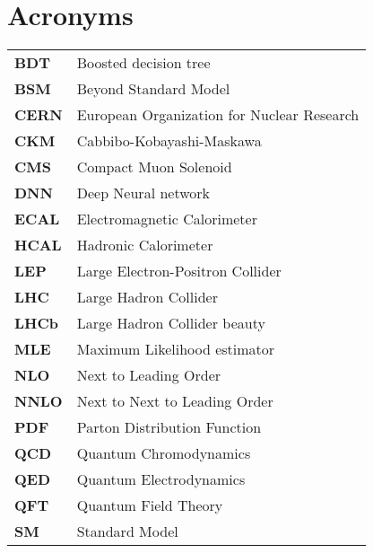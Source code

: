 
\newpage
\chapter*{Acronyms}




\begin{table}[h!]
    \centering
    \begin{tabular}{l l} 

        \textbf{BDT} & Boosted decision tree \\ [0.5ex] 
        \textbf{BSM} & Beyond Standard Model \\ [0.5ex] 
        \textbf{CERN} & European Organization for Nuclear Research \\ [0.5ex] 
        \textbf{CKM} & Cabbibo-Kobayashi-Maskawa \\ [0.5ex] 
        \textbf{CMS} & Compact Muon Solenoid \\ [0.5ex] 
        \textbf{DNN} & Deep Neural network \\ [0.5ex] 
        \textbf{ECAL} & Electromagnetic Calorimeter \\ [0.5ex] 
        \textbf{HCAL} & Hadronic Calorimeter \\ [0.5ex] 
        \textbf{LEP} & Large Electron-Positron Collider \\ [0.5ex] 
        \textbf{LHC} & Large Hadron Collider \\ [0.5ex] 
        \textbf{LHCb} & Large Hadron Collider beauty \\ [0.5ex]
        \textbf{MLE} & Maximum Likelihood estimator \\ [0.5ex]
        \textbf{NLO} & Next to Leading Order \\ [0.5ex] 
        \textbf{NNLO} & Next to Next to Leading Order \\ [0.5ex] 
        \textbf{PDF} & Parton Distribution Function \\ [0.5ex] 
        \textbf{QCD} & Quantum Chromodynamics \\ [0.5ex] 
        \textbf{QED} & Quantum Electrodynamics \\ [0.5ex] 
        \textbf{QFT} & Quantum Field Theory \\ [0.5ex] 
        \textbf{SM} & Standard Model \\ [0.5ex] 
        
     
     
     
      

     
      
     


    \end{tabular}
    \end{table}